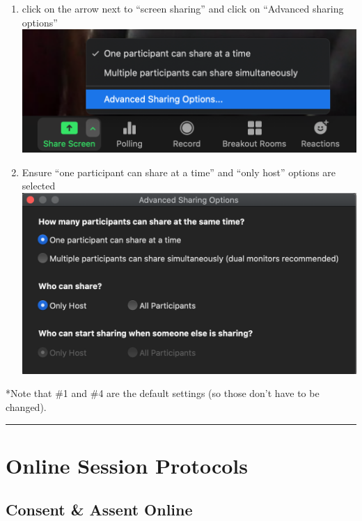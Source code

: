 \documentclass[]{book}
\providecommand{\tightlist}{%
  \setlength{\itemsep}{0pt}\setlength{\parskip}{0pt}}
\begin{document}
\begin{enumerate}
  \begin{enumerate}
  \def\labelenumii{\alph{enumii}.}
  \tightlist
  \item
    click on the arrow next to ``screen sharing'' and click on ``Advanced sharing options'' \includegraphics{images/zoom_security/2.png}
  \item
    Ensure ``one participant can share at a time'' and ``only host'' options are selected \includegraphics{images/zoom_security/3.png}
  \end{enumerate}
\end{enumerate}

*Note that \#1 and \#4 are the default settings (so those don't have to be changed).

\begin{center}\rule{0.5\linewidth}{0.5pt}\end{center}

\hypertarget{online-session-protocols}{%
\section{Online Session Protocols}\label{online-session-protocols}}

\hypertarget{consent-assent-online}{%
\subsection{Consent \& Assent Online}\label{consent-assent-online}}
\end{document}
